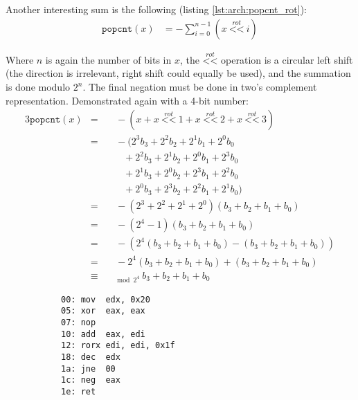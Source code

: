 Another interesting sum is the following (listing \ref{lst:arch:popcnt_rot}):
\begin{align*}
    \texttt{popcnt}(x)
        &= -\sum_{i=0}^{n-1} (x ~ \overset{rot}{\texttt{<{}<}} ~ i)
\end{align*}

Where $n$ is again the number of bits in $x$, the $\overset{rot}{\texttt{<{}<}}$
operation is a circular left shift (the direction is irrelevant, right shift
could equally be used), and the summation is done modulo $2^n$.  The final
negation must be done in two's complement representation.  Demonstrated again
with a 4-bit number:
\begin{alignat*}{3}
    \texttt{popcnt}(x)
        &= && ~ -(x
            + x ~ \overset{rot}{\texttt{<{}<}} ~ 1
            + x ~ \overset{rot}{\texttt{<{}<}} ~ 2
            + x ~ \overset{rot}{\texttt{<{}<}} ~ 3
        ) \\
        &= && ~ -(2^3b_3+2^2b_2+2^1b_1+2^0b_0 \\
        &  && \quad +2^2b_3+2^1b_2+2^0b_1+2^3b_0 \\
        &  && \quad +2^1b_3+2^0b_2+2^3b_1+2^2b_0 \\
        &  && \quad +2^0b_3+2^3b_2+2^2b_1+2^1b_0) \\
        &= && ~ -(2^3+2^2+2^1+2^0)(b_3+b_2+b_1+b_0) \\
        &= && ~ -(2^4-1)(b_3+b_2+b_1+b_0) \\
        &= && ~ -(2^4(b_3+b_2+b_1+b_0) - (b_3+b_2+b_1+b_0)) \\
        &= && ~ -2^4(b_3+b_2+b_1+b_0) + (b_3+b_2+b_1+b_0) \\
        &\equiv&&_{\bmod 2^4} ~ b_3+b_2+b_1+b_0
\end{alignat*}

\begin{figure}[ht]
    \centering
    \vspace{-\baselineskip}
    \begin{subfigure}[t]{0.65\textwidth}
        
    \end{subfigure}
    \hspace*{\fill}
    \begin{subfigure}[t]{0.3\textwidth}
        \begin{lstlisting}[style=x86]
00: mov  edx, 0x20
05: xor  eax, eax
07: nop
10: add  eax, edi
12: rorx edi, edi, 0x1f
18: dec  edx
1a: jne  00
1c: neg  eax
1e: ret
        \end{lstlisting}
    \end{subfigure}
    \vspace{-2\baselineskip}
\end{figure}


